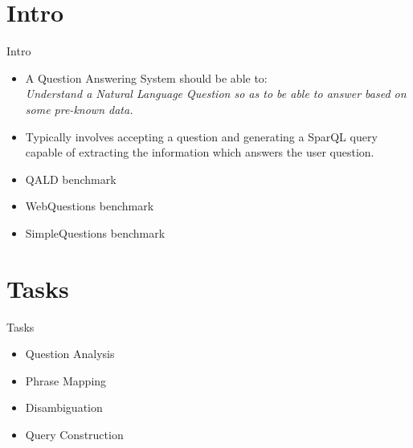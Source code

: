 \documentclass{beamer}
\begin{document}
\section{Intro}

\begin{frame}{Intro}
  \begin{cardTiny}
    \begin{itemize}
      \item A Question Answering System should be able to: \\
      \textit{Understand a Natural Language Question so as to be able to answer based on some pre-known data.}
    \end{itemize}
  \end{cardTiny}
  \begin{cardTiny}
    \begin{itemize}
      \item Typically involves accepting a question and generating a SparQL query capable of extracting the information which answers the user question.
    \end{itemize}
  \end{cardTiny}
  \begin{cardTiny}
    \begin{itemize}
      \item QALD benchmark
      \item WebQuestions benchmark
      \item SimpleQuestions benchmark
    \end{itemize}
  \end{cardTiny}
\end{frame}

\section{Tasks}

\begin{frame}{Tasks}
  \begin{card}
    \begin{itemize}
      \item Question Analysis
      \item Phrase Mapping
      \item Disambiguation
      \item Query Construction
    \end{itemize}
  \end{card}
\end{frame}
\end{document}

